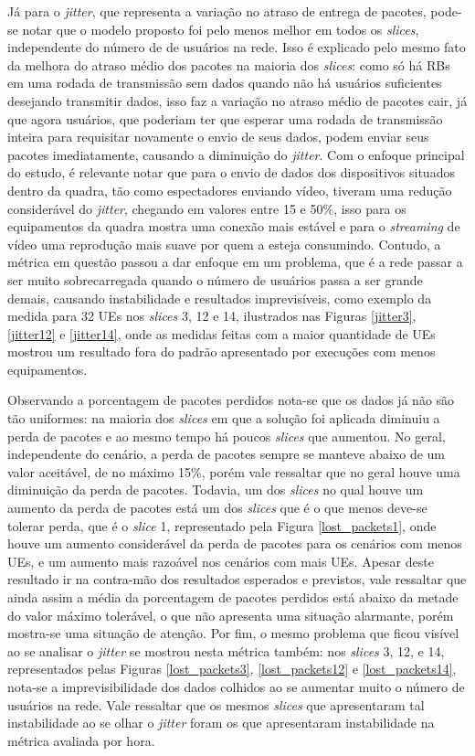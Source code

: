 \documentclass[11pt,twoside]{article}
\begin{document}
	Já para o \textit{jitter}, que representa a variação no atraso de entrega de pacotes, pode-se notar que o modelo proposto foi pelo menos melhor em todos os \textit{slices}, independente do número de de usuários na rede. Isso é explicado pelo mesmo fato da melhora do atraso médio dos pacotes na maioria dos \textit{slices}: como só há RBs em uma rodada de transmissão sem dados quando não há usuários suficientes desejando transmitir dados, isso faz a variação no atraso médio de pacotes cair, já que agora usuários, que poderiam ter que esperar uma rodada de transmissão inteira para requisitar novamente o envio de seus dados, podem enviar seus pacotes imediatamente, causando a diminuição do \textit{jitter}. Com o enfoque principal do estudo, é relevante notar que para o envio de dados dos dispositivos situados dentro da quadra, tão como espectadores enviando vídeo, tiveram uma redução considerável do \textit{jitter}, chegando em valores entre 15 e 50\%, isso para os equipamentos da quadra mostra uma conexão mais estável e para o \textit{streaming} de vídeo uma reprodução mais suave por quem a esteja consumindo. Contudo, a métrica em questão passou a dar enfoque em um problema, que é a rede passar a ser muito sobrecarregada quando o número de usuários passa a ser grande demais, causando instabilidade e resultados imprevisíveis, como exemplo da medida para 32 UEs nos  \textit{slices} 3, 12 e 14, ilustrados nas Figuras \ref{jitter3}, \ref{jitter12} e \ref{jitter14}, onde as medidas feitas com a maior quantidade de UEs mostrou um resultado fora do padrão apresentado por execuções com menos equipamentos.

	Observando a porcentagem de pacotes perdidos nota-se que os dados já não são tão uniformes: na maioria dos \textit{slices} em que a solução foi aplicada diminuiu a perda de pacotes e ao mesmo tempo há poucos \textit{slices} que aumentou. No geral, independente do cenário, a perda de pacotes sempre se manteve abaixo de um valor aceitável, de no máximo 15\%, porém vale ressaltar que no geral houve uma diminuição da perda de pacotes. Todavia, um dos \textit{slices} no qual houve um aumento da perda de pacotes está um dos \textit{slices} que é o que menos deve-se tolerar perda, que é o \textit{slice} 1, representado pela Figura \ref{lost_packets1}, onde houve um aumento considerável da perda de pacotes para os cenários com menos UEs, e um aumento mais razoável nos cenários com mais UEs. Apesar deste resultado ir na contra-mão dos resultados esperados e previstos, vale ressaltar que ainda assim a média da porcentagem de pacotes perdidos está abaixo da metade do valor máximo tolerável, o que não apresenta uma situação alarmante, porém mostra-se uma situação de atenção. Por fim, o mesmo problema que ficou visível ao se analisar o  \textit{jitter} se mostrou nesta métrica também: nos \textit{slices} 3, 12, e 14, representados pelas Figuras \ref{lost_packets3}, \ref{lost_packets12} e \ref{lost_packets14}, nota-se a imprevisibilidade dos dados colhidos ao se aumentar muito o número de usuários na rede. Vale ressaltar que os mesmos \textit{slices} que apresentaram tal instabilidade ao se olhar o \textit{jitter} foram os que apresentaram instabilidade na métrica avaliada por hora.
\end{document}
